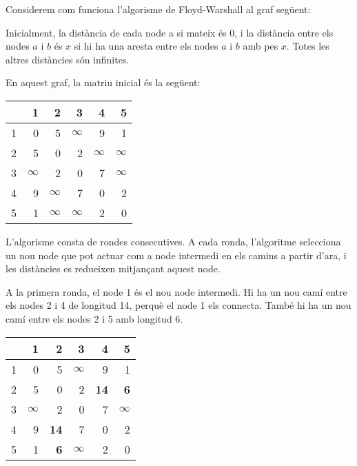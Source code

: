 Considerem com funciona l'algorisme de Floyd-Warshall al graf següent:


\begin{center}
\end{center}


Inicialment, la distància de cada node a si mateix és $0$, i la
distància entre els nodes $a$ i $b$ és $x$ si hi ha una aresta entre
els nodes $a$ i $b$ amb pes $x$. Totes les altres distàncies són
infinites.

En aquest graf, la matriu inicial és la següent:
\begin{center}
\begin{tabular}{r|rrrrr}
 & 1 & 2 & 3 & 4 & 5 \\
\hline
1 & 0 & 5 & $\infty$ & 9 & 1 \\
2 & 5 & 0 & 2 & $\infty$ & $\infty$ \\
3 & $\infty$ & 2 & 0 & 7 & $\infty$ \\
4 & 9 & $\infty$ & 7 & 0 & 2 \\
5 & 1 & $\infty$ & $\infty$ & 2 & 0 \\
\end{tabular}
\end{center}
\vspace{10pt} L'algorisme consta de rondes consecutives. A cada ronda,
l'algoritme selecciona un nou node que pot actuar com a node intermedi
en els camins a partir d'ara, i les distàncies es redueixen mitjançant
aquest node.

A la primera ronda, el node 1 és el nou node intermedi. Hi ha un nou
camí entre els nodes 2 i 4 de longitud 14, perquè el node 1 els
connecta. També hi ha un nou camí entre els nodes 2 i 5 amb longitud
6.


\begin{center}
\begin{tabular}{r|rrrrr}
 & 1 & 2 & 3 & 4 & 5 \\
\hline
1 & 0 & 5 & $\infty$ & 9 & 1 \\
2 & 5 & 0 & 2 & \textbf{14} & \textbf{6} \\
3 & $\infty$ & 2 & 0 & 7 & $\infty$ \\
4 & 9 & \textbf{14} & 7 & 0 & 2 \\
5 & 1 & \textbf{6} & $\infty$ & 2 & 0 \\
\end{tabular}
\end{center}
\vspace{10pt}

